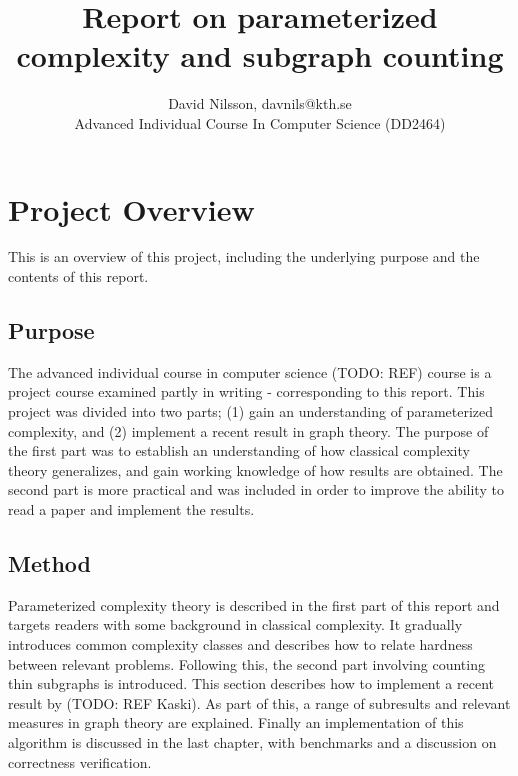 \documentclass[a4paper,11pt]{report}
\title{Report on parameterized complexity and subgraph counting}
\author{David Nilsson, davnils@kth.se \\ Advanced Individual Course In Computer Science (DD2464)}
\theoremstyle{plain}
\theoremstyle{definition}
\begin{document}
\maketitle
{}

\tableofcontents

\chapter{Project Overview}
This is an overview of this project, including the underlying purpose and the contents of this report.

\section{Purpose}
The advanced individual course in computer science (TODO: REF) course is a project course examined partly in writing - corresponding to this report.
This project was divided into two parts; (1) gain an understanding of parameterized complexity, and (2) implement a recent result in graph theory.
The purpose of the first part was to establish an understanding of how classical complexity theory generalizes, and gain working knowledge of how results are obtained.
The second part is more practical and was included in order to improve the ability to read a paper and implement the results.

\section{Method}
Parameterized complexity theory is described in the first part of this report and targets readers with some background in classical complexity.
It gradually introduces common complexity classes and describes how to relate hardness between relevant problems.
Following this, the second part involving counting thin subgraphs is introduced.
This section describes how to implement a recent result by (TODO: REF Kaski).
As part of this, a range of subresults and relevant measures in graph theory are explained.
Finally an implementation of this algorithm is discussed in the last chapter, with benchmarks and a discussion on correctness verification.
\end{document}
